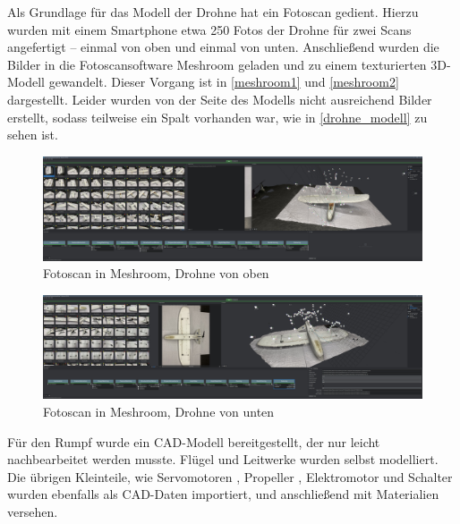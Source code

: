 Als Grundlage für das Modell der Drohne hat ein Fotoscan gedient. Hierzu wurden mit einem Smartphone etwa 250 Fotos der Drohne für zwei Scans angefertigt -- einmal von oben und einmal von unten. Anschließend wurden die Bilder in die Fotoscansoftware Meshroom geladen und zu einem texturierten 3D-Modell gewandelt. Dieser Vorgang ist in \autoref{meshroom1} und \autoref{meshroom2} dargestellt. Leider wurden von der Seite des Modells nicht ausreichend Bilder erstellt, sodass teilweise ein Spalt vorhanden war, wie in \autoref{drohne_modell} zu sehen ist.\\
\begin{figure}[H]
\begin{center}
\includegraphics[width=\textwidth]{gfx/prod/plane/meshroom1.jpg}
\caption{Fotoscan in Meshroom, Drohne von oben}
\label{meshroom1}
\end{center}
\end{figure}

\begin{figure}[H]
\begin{center}
\includegraphics[width=\textwidth]{gfx/prod/plane/meshroom2.jpg}
\caption{Fotoscan in Meshroom, Drohne von unten}
\label{meshroom2}
\end{center}
\end{figure}

Für den Rumpf wurde ein CAD-Modell bereitgestellt, der nur leicht nachbearbeitet werden musste. Flügel und Leitwerke wurden selbst modelliert.\\
Die übrigen Kleinteile, wie Servomotoren \cite{Hobby}, Propeller \cite{propeller}, Elektromotor \cite{brushless} und Schalter \cite{Rocker} wurden ebenfalls als CAD-Daten importiert, und anschließend mit Materialien versehen.


